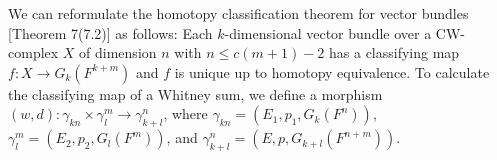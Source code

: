 We can reformulate the homotopy classification theorem for vector bundles [Theorem 7(7.2)] as follows: Each $k$-dimensional vector bundle over a CW-complex $X$ of dimension $n$ with $n \leq c(m+1) - 2$ has a classifying map $f: X \to G_k(F^{k+m})$ and $f$ is unique up to homotopy equivalence. To calculate the classifying map of a Whitney sum, we define a morphism $(w, d): \gamma_{kn} \times \gamma_l^m \to \gamma_{k+l}^n$, where $\gamma_{kn} = (E_1, p_1, G_k(F^n))$, $\gamma_l^m = (E_2, p_2, G_l(F^m))$, and $\gamma_{k+l}^n = (E, p, G_{k+l}(F^{n+m}))$.
